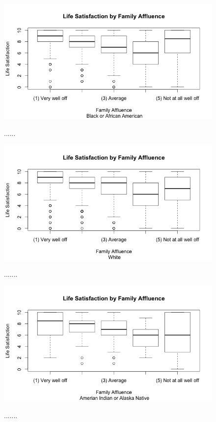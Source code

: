 \documentclass[12pt]{article}
\begin{document}
\begin{figure}[hptb]
	\centering
{\includegraphics[scale=0.45]{boxplotafrican.png}} \;
\caption{......}
	\label{fig:img}
\end{figure}

\begin{figure}[hptb]
	\centering
{\includegraphics[scale=0.45]{boxplotwhite.png}} \;
\caption{.......}
	\label{fig:img}
\end{figure}

\begin{figure}[hptb]
	\centering
{\includegraphics[scale=0.45]{boxplotamericanindian.png}} \;
\caption{.......}
	\label{fig:img}
\end{figure}
\end{document}
